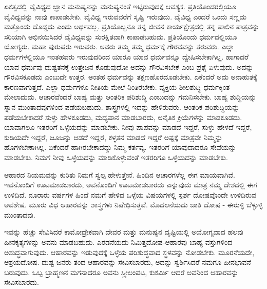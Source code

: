 ಏಕತ್ವದಲ್ಲಿ ವೈವಿಧ್ಯದ ಜ್ಞಾನ ಮನುಷ್ಯನನ್ನು ಮನುಷ್ಯನಂತೆ ಇಟ್ಟಿರುವುದಕ್ಕೆ ಆವಶ್ಯಕ. ಪ್ರತಿಯೊಂದರಲ್ಲಿಯೂ ವೈವಿಧ್ಯವನ್ನು ನಾವು ಕಾಪಾಡಬೇಕು. ವೈವಿಧ್ಯ ಇರುವವರೆಗೆ ಸೃಷ್ಟಿ ಇರುವುದು. ವೈವಿಧ್ಯ ಎಂದರೆ ಒಂದು ಸಣ್ಣದು ಮತ್ತೊಂದು ದೊಡ್ಡದು ಎಂದು ಅರ್ಥವಲ್ಲ. ಪ್ರತಿಯೊಬ್ಬನೂ ತನ್ನ ಜೀವನ ಕಾರ್ಯಕ್ಷೇತ್ರದಲ್ಲಿ ತನ್ನ ಪಾಲಿನ ಪಾತ್ರವನ್ನು ಸರಿಯಾಗಿ ಅಭಿನಯಿಸಿದರೆ ವೈವಿಧ್ಯವನ್ನು ಸುರಕ್ಷಿತವಾಗಿ ಕಾಪಾಡಬಹುದು. ಪ್ರತಿಯೊಂದು ಧರ್ಮದಲ್ಲಿಯೂ ಯೋಗ್ಯರು. ಮಹಾ ಪುರುಷರು ಇರುವರು. ಅವರು ತಮ್ಮ ತಮ್ಮ ಧರ್ಮಕ್ಕೆ ಗೌರವವನ್ನು ತರುವರು. ಎಲ್ಲಾ ಧರ್ಮಗಳಲ್ಲಿಯೂ ಇಂತಹವರು ಇರುವುದರಿಂದ ಯಾರೂ ಯಾವ ಧರ್ಮವನ್ನೂ ದ್ವೇಷಿಸಬೇಕಾಗಿಲ್ಲ. ಹಾಗಾದರೆ ಯಾವ ಧರ್ಮವು ದುಷ್ಟತನಕ್ಕೆ ಉತ್ತೇಜನ ಕೊಡುವುದೋ ಅದನ್ನು ಗೌರವಿಸಬೇಕೆ ಎಂಬ ಪ್ರಶ್ನೆ ಏಳುವುದು. ಅದನ್ನು ಗೌರವಿಸಕೂಡದು ಎಂಬುದೇ ಉತ್ತರ. ಅಂತಹ ಧರ್ಮವನ್ನು ತಕ್ಷಣ\break ಹೊರದೂಡಬೇಕು. ಏಕೆಂದರೆ ಅದು ಅನಾಹುತಕ್ಕೆ ಕಾರಣವಾಗುತ್ತದೆ. ಎಲ್ಲಾ ಧರ್ಮಗಳೂ ನೀತಿಯ ಮೇಲೆ ನಿಂತಿರಬೇಕು. ವ್ಯಕ್ತಿಯ ಶೀಲಶುದ್ಧಿ ಧರ್ಮಕ್ಕಿಂತ ಮೇಲಾದುದು. ಆಚಾರವೆಂದರೆ ಬಾಹ್ಯ ಮತ್ತು ಆಂತರಿಕ ಪರಿಶುದ್ಧಿ ಎಂಬುದನ್ನು ಗಮನಿಸಬೇಕು. ಬಾಹ್ಯ ಶುದ್ಧಿಯನ್ನು ಸ್ನಾನ ಮುಂತಾದವುಗಳಿಂದ ಪಡೆಯಬಹುದು. ಶಾಸ್ತ್ರಗಳಲ್ಲಿ ಇದನ್ನು ಹೇಳಿರುವರು. ಆಂತರಿಕ ಪರಿಶುದ್ಧಿಯನ್ನು ಪಡೆಯಬೇಕಾದರೆ ಸುಳ್ಳು ಹೇಳಕೂಡದು, ಮದ್ಯಪಾನ ಮಾಡಬಾರದು, ಅನೈತಿಕ ಕ್ರಿಯೆಗಳನ್ನು ಮಾಡಕೂಡದು. ಯಾವಾಗಲೂ ಇತರರಿಗೆ ಒಳ್ಳೆಯದನ್ನು ಮಾಡಬೇಕು. ನೀವು ಪಾಪವನ್ನು ಮಾಡದೆ ಇದ್ದರೆ, ಸುಳ್ಳು ಹೇಳದೆ ಇದ್ದರೆ, ಕುಡಿಯದೇ ಇದ್ದರೆ, ಜೂಜನ್ನು ಆಡದೆ ಇದ್ದರೆ, ಕಳ್ಳತನ ಮಾಡದೆ ಇದ್ದರೆ ಅಷ್ಟಕ್ಕೆ ಮಾತ್ರವೇ ನಿಮ್ಮನ್ನು ಹೊಗಳಬೇಕಾಗಿಲ್ಲ. ಏಕೆಂದರೆ ಹಾಗಿರಬೇಕಾದದ್ದು ನಿಮ್ಮ ಕರ್ತವ್ಯ. ಇತರರಿಗೆ ಯಾವುದಾದರೂ ಸೇವೆಯನ್ನು ಮಾಡಬೇಕು. ನಿಮಗೆ ನೀವು ಒಳ್ಳೆಯದನ್ನು ಮಾಡಿಕೊಳ್ಳುವಂತೆ ಇತರರಿಗೂ ಒಳ್ಳೆಯದನ್ನು ಮಾಡಬೇಕು.

ಆಹಾರದ ನಿಯಮವನ್ನು ಕುರಿತು ನಿಮಗೆ ಸ್ವಲ್ಪ ಹೇಳುತ್ತೇನೆ. ಹಿಂದಿನ ಆಚಾರಗಳೆಲ್ಲ ಈಗ ಮಾಯವಾಗಿವೆ. ಇವನೊಂದಿಗೆ ಊಟಮಾಡಬಾರದು, ಅವನೊಂದಿಗೆ ಊಟಮಾಡಬಾರದು ಎನ್ನುವುದು ಮಾತ್ರ ನಮ್ಮ ದೇಶದಲ್ಲಿ ಈಗ ಉಳಿದಿದೆ. ನೂರಾರು ವರ್ಷಗಳ ಹಿಂದೆ ನಮಗೆ ಹೇಳಿದ ಒಳ್ಳೆಯ ವಿಷಯಗಳಲ್ಲಿ ಸ್ಪರ್ಶ ದೋಷವೊಂದೇ ಉಳಿದಿರುವ ಅವಶೇಷ. ಮೂರು ವಿಧ ಆಹಾರವನ್ನು ಶಾಸ್ತ್ರಗಳು ನಿಷೇಧಿಸುತ್ತವೆ. ಮೊದಲನೆಯದು ಜಾತಿ ದೋಷ - ಈರುಳ್ಳಿ ಬೆಳ್ಳುಳ್ಳಿ ಮುಂತಾದವು.

ಇವನ್ನು ಹೆಚ್ಚು ಸೇವಿಸಿದರೆ ಕಾಮೋದ್ರೇಕವಾಗಿ ದೇವರ ಮತ್ತು ಮನುಷ್ಯನ ದೃಷ್ಟಿಯಲ್ಲಿ ಅಯೋಗ್ಯವಾದ ಹಲವು ಹೀನಕೃತ್ಯಗಳನ್ನು ಅವನು ಮಾಡಬಹುದು. ಎರಡನೆಯದು ನಿಮಿತ್ತದೋಷ-ಆಹಾರವು ಬಾಹ್ಯ ವಸ್ತುಗಳಿಂದ ಅಶುದ್ಧವಾಗುವುದು. ಆಹಾರವನ್ನು ಇಡುವುದಕ್ಕೆ ಒಳ್ಳೆಯ ಪರಿಶುದ್ಧವಾದ ಸ್ಥಳವನ್ನು ನೋಡಬೇಕು. ಮೂರನೆಯದೇ, ಆಶ್ರಯದೋಷ. ದುಷ್ಟ ಜನರು ತಂದ ಆಹಾರವನ್ನು ಸೇವಿಸಬಾರದು, ಅದನ್ನು ಸ್ವರ್ಶಿಸಿದರೆ ನಮಗೂ ಹೀನಭಾವನೆ ಬರುವುದು. ಒಬ್ಬ ಬ್ರಾಹ್ಮಣನ ಮಗನಾದರೂ ಅವನು ಸ್ತ್ರೀಲಂಪಟ, ಕುಕರ್ಮಿ ಆದರೆ ಅವನಿಂದ ಆಹಾರವನ್ನು ಸೇವಿಸಬಾರದು.

